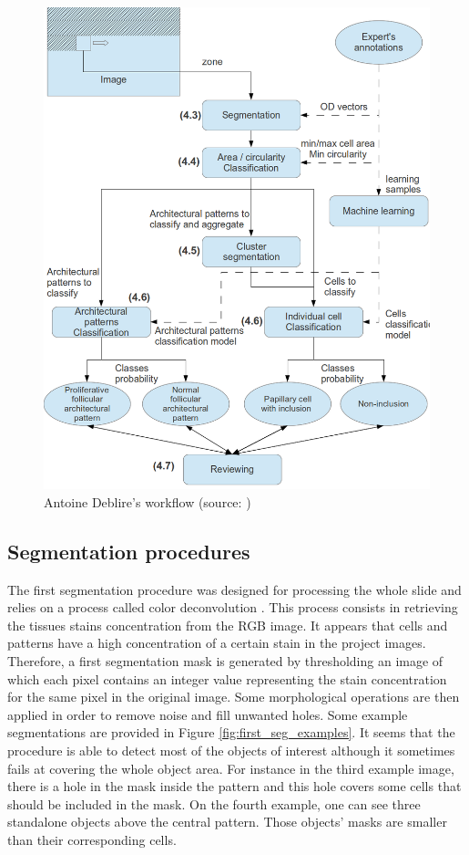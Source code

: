 \begin{figure}
	\center
	\includegraphics[scale=0.95]{image/adeblire_workflow.png}
	\caption{Antoine Deblire's workflow (source: \cite{adeblire2013})}
	\label{fig:workflow_adeblire}
\end{figure}

\subsection{Segmentation procedures}
The first segmentation procedure was designed for processing the whole slide and relies on a process called color deconvolution \cite{ruifrok2001quantification}. This process consists in retrieving the tissues stains concentration from the RGB image. It appears that cells and patterns have a high concentration of a certain stain in the project images. Therefore, a first segmentation mask is generated by thresholding an image of which each pixel contains an integer value representing the stain concentration for the same pixel in the original image. Some morphological operations are then applied in order to remove noise and fill unwanted holes. Some example segmentations are provided in Figure \ref{fig:first_seg_examples}. It seems that the procedure is able to detect most of the objects of interest although it sometimes fails at covering the whole object area. For instance in the third example image, there is a hole in the mask inside the pattern and this hole covers some cells that should be included in the mask. On the fourth example, one can see three standalone objects above the central pattern. Those objects' masks are smaller than their corresponding cells.

